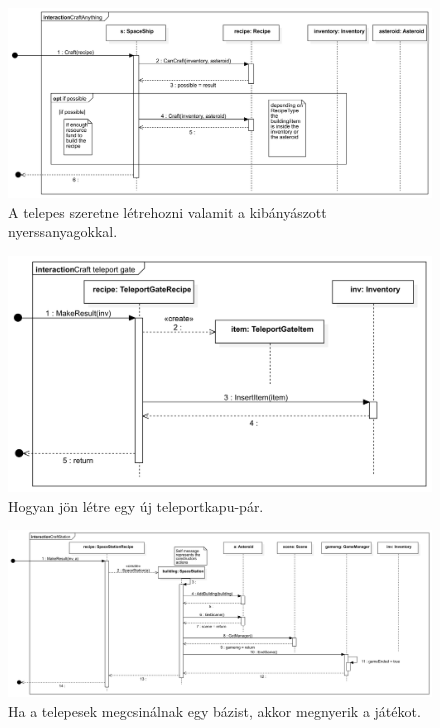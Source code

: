 \begin{figure}[H] 
\centering 
\includegraphics[width=1\textwidth]{docs/3_Project/svg/Design Model!Crafting!Craft!CraftAnything_19.png} 
\caption{A telepes szeretne létrehozni valamit a kibányászott nyerssanyagokkal.} 
\end{figure} 

\begin{figure}[H] 
\centering 
\includegraphics[width=1\textwidth]{docs/3_Project/svg/Design Model!Crafting!Craft teleport gate!Craft teleport gate_20.png} 
\caption{Hogyan jön létre egy új teleportkapu-pár.} 
\end{figure} 

\begin{figure}[H] 
\centering 
\includegraphics[width=1\textwidth]{docs/3_Project/svg/Design Model!Crafting!CraftStation!CraftStation_21.png} 
\caption{Ha a telepesek megcsinálnak egy bázist, akkor megnyerik a játékot.} 
\end{figure} 

